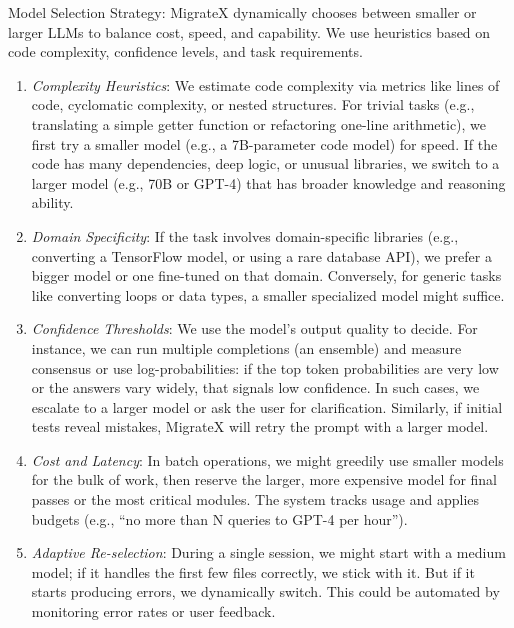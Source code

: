\documentclass[twocolumn]{article}
\begin{document}
    {Model Selection Strategy}: MigrateX dynamically chooses between smaller or larger LLMs to balance cost, speed, and capability. We use heuristics based on code complexity, confidence levels, and task requirements.

    \begin{enumerate}
        \item \textit{Complexity Heuristics}: We estimate code complexity via metrics like lines of code, cyclomatic complexity, or nested structures. For trivial tasks (e.g., translating a simple getter function or refactoring one-line arithmetic), we first try a smaller model (e.g., a 7B-parameter code model) for speed. If the code has many dependencies, deep logic, or unusual libraries, we switch to a larger model (e.g., 70B or GPT-4) that has broader knowledge and reasoning ability.

        \item \textit{Domain Specificity}: If the task involves domain-specific libraries (e.g., converting a TensorFlow model, or using a rare database API), we prefer a bigger model or one fine-tuned on that domain. Conversely, for generic tasks like converting loops or data types, a smaller specialized model might suffice.

        \item \textit{Confidence Thresholds}: We use the model’s output quality to decide. For instance, we can run multiple completions (an ensemble) and measure consensus or use log-probabilities: if the top token probabilities are very low or the answers vary widely, that signals low confidence. In such cases, we escalate to a larger model or ask the user for clarification. Similarly, if initial tests reveal mistakes, MigrateX will retry the prompt with a larger model.

        \item \textit{Cost and Latency}: In batch operations, we might greedily use smaller models for the bulk of work, then reserve the larger, more expensive model for final passes or the most critical modules. The system tracks usage and applies budgets (e.g., ``no more than N queries to GPT-4 per hour'').

        \item \textit{Adaptive Re-selection}: During a single session, we might start with a medium model; if it handles the first few files correctly, we stick with it. But if it starts producing errors, we dynamically switch. This could be automated by monitoring error rates or user feedback.
    \end{enumerate}
\end{document}
